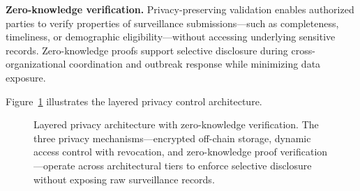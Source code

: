 \documentclass[AMA,LATO1COL]{WileyNJD-v2}
\begin{document}
\textbf{Zero-knowledge verification.} Privacy-preserving validation enables authorized parties to verify properties of surveillance submissions---such as completeness, timeliness, or demographic eligibility---without accessing underlying sensitive records. Zero-knowledge proofs support selective disclosure during cross-organizational coordination and outbreak response while minimizing data exposure.

Figure~\ref{fig:privacy} illustrates the layered privacy control architecture.

\begin{figure}[!ht]
\centering
{}
\caption{Layered privacy architecture with zero-knowledge verification. The three privacy mechanisms---encrypted off-chain storage, dynamic access control with revocation, and zero-knowledge proof verification---operate across architectural tiers to enforce selective disclosure without exposing raw surveillance records.}\label{fig:privacy}
\end{figure}

%
%
%
\end{document}
